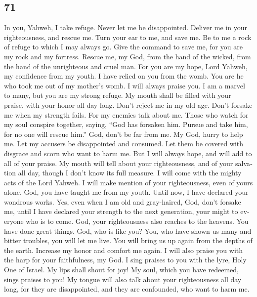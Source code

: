 \begin{paracol}{2}
\switchcolumn
\begin{otherlanguage}{english}

\hypertarget{section-141}{%
\section{71}\label{section-141}}

 In you, Yahweh, I take refuge. Never let me be
disappointed.  Deliver me in your righteousness, and
rescue me. Turn your ear to me, and save me.  Be to me a
rock of refuge to which I may always go. Give the command to save me,
for you are my rock and my fortress.  Rescue me, my God,
from the hand of the wicked, from the hand of the unrighteous and cruel
man.  For you are my hope, Lord Yahweh, my confidence from
my youth.  I have relied on you from the womb. You are he
who took me out of my mother's womb. I will always praise you.
 I am a marvel to many, but you are my strong refuge.
 My mouth shall be filled with your praise, with your
honor all day long.  Don't reject me in my old age. Don't
forsake me when my strength fails.  For my enemies talk
about me. Those who watch for my soul conspire together, 
saying, ``God has forsaken him. Pursue and take him, for no one will
rescue him.''  God, don't be far from me. My God, hurry
to help me.  Let my accusers be disappointed and
consumed. Let them be covered with disgrace and scorn who want to harm
me.  But I will always hope, and will add to all of your
praise.  My mouth will tell about your righteousness, and
of your salvation all day, though I don't know its full measure.
 I will come with the mighty acts of the Lord Yahweh. I
will make mention of your righteousness, even of yours alone.
 God, you have taught me from my youth. Until now, I have
declared your wondrous works.  Yes, even when I am old
and gray-haired, God, don't forsake me, until I have declared your
strength to the next generation, your might to everyone who is to come.
 God, your righteousness also reaches to the heavens. You
have done great things. God, who is like you?  You, who
have shown us many and bitter troubles, you will let me live. You will
bring us up again from the depths of the earth.  Increase
my honor and comfort me again.  I will also praise you
with the harp for your faithfulness, my God. I sing praises to you with
the lyre, Holy One of Israel.  My lips shall shout for
joy! My soul, which you have redeemed, sings praises to you!
 My tongue will also talk about your righteousness all
day long, for they are disappointed, and they are confounded, who want
to harm me.


\end{otherlanguage}
\end{paracol}
